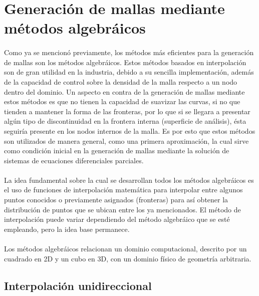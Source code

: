 \documentclass[letterpaper, openright, 12pt]{book}
\begin{document}
\section{Generación de mallas mediante métodos algebráicos}
    \paragraph*{}
     Como ya se mencionó previamente, los métodos más eficientes para la
     generación de mallas son los métodos algebráicos. Estos métodos basados
     en interpolación son de gran utilidad en la industria, debido a su
     sencilla implementación, además de la capacidad de control sobre la
     densidad de la malla respecto a un nodo dentro del dominio. Un aspecto
     en contra de la generación de mallas mediante estos métodos es que no
     tienen la capacidad de suavizar las curvas, si no que tienden a mantener
     la forma de las fronteras, por lo que si se llegara a presentar algún
     tipo de discontinuidad en la frontera interna (superficie de análisis),
     ésta seguiría presente en los nodos internos de la malla. Es por esto que
     estos métodos son utilizados de manera general, como una primera
     aproximación, la cual sirve como condición inicial en la generación de
     mallas mediante la solución de sistemas de ecuaciones diferenciales
     parciales.\cite{farrashkhalvat}

    \paragraph*{}
    La idea fundamental sobre la cual se desarrollan todos los métodos
    algebráicos es el uso de funciones de interpolación matemática para
    interpolar entre algunos puntos conocidos o previamente asignados
    (fronteras) para así obtener la distribución de puntos que se ubican
    entre los ya mencionados. El método de interpolación puede variar
    dependiendo del método algebráico que se esté empleando, pero la idea
    base permanece.\cite{siladicParabolic}

    \paragraph*{}
    Los métodos algebráicos relacionan un dominio computacional, descrito
    por un cuadrado en 2D y un cubo en 3D, con un dominio físico de
    geometría arbitraria.

    \subsection{Interpolación unidireccional}
\end{document}
